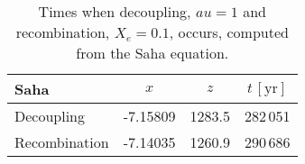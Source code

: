 \begin{table}[h]
\centering
\caption{Times when decoupling, $	au=1$ and recombination, $X_e=0.1$, occurs, computed from the Saha equation.}
\label{tab:M2:results:rec_and_dec_time_table_Saha}
\begin{tabular}{l|ccc}
\toprule
         Saha &      $x$ &    $z$ & $t\,\mathrm{[yr]}$ \\
\midrule
   Decoupling & -7.15809 & 1283.5 &           282\,051 \\
Recombination & -7.14035 & 1260.9 &           290\,686 \\
\bottomrule
\end{tabular}
\end{table}

